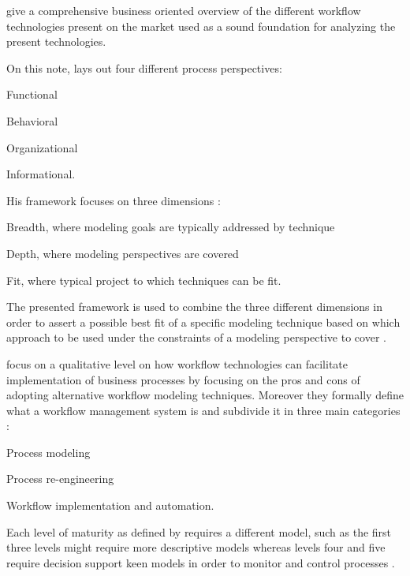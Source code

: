 \citet{Georgakopoulos1995} give a comprehensive business oriented overview of the different workflow technologies present on the market used as a sound foundation for analyzing the present technologies.

On this note, \citet{Giaglis2001} lays out four different process perspectives:
\begin{enumerate*}
	\item Functional
	\item Behavioral
	\item Organizational
	\item Informational.
\end{enumerate*}

His framework focuses on three dimensions \citep{Giaglis2001}:
\begin{enumerate*}
	\item Breadth, where modeling goals are typically addressed by technique
	\item Depth, where modeling perspectives are covered
	\item Fit, where typical project to which techniques can be fit.
\end{enumerate*}

The presented framework is used to combine the three different dimensions in order to assert a possible best fit of a specific modeling technique based on which approach to be used under the constraints of a modeling perspective to cover \citep{Giaglis2001}.

\citet{Mentzas2001} focus on a qualitative level on how workflow technologies can facilitate implementation of business processes by focusing on the pros and cons of adopting alternative workflow modeling techniques. Moreover they formally define what a workflow management system is and subdivide it in three main categories \citep{Mentzas2001}:
\begin{enumerate*}
	\item Process modeling
	\item Process re-engineering
	\item Workflow implementation and automation.
\end{enumerate*}

Each level of maturity as defined by \citet{Macintosh1993} requires a different model, such as the first three levels might require more descriptive models whereas levels four and five require decision support keen models in order to monitor and control processes \citep{Mentzas2001}.

